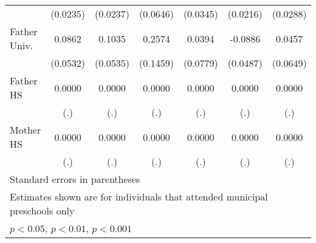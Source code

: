 \begin{table}[htbp]
\begin{tabular}{l*{6}{c}}
            &    (0.0235)         &    (0.0237)         &    (0.0646)         &    (0.0345)         &    (0.0216)         &    (0.0288)         \\
\addlinespace
Father Univ.&      0.0862         &      0.1035         &      0.2574         &      0.0394         &     -0.0886         &      0.0457         \\
            &    (0.0532)         &    (0.0535)         &    (0.1459)         &    (0.0779)         &    (0.0487)         &    (0.0649)         \\
\addlinespace
Father HS   &      0.0000         &      0.0000         &      0.0000         &      0.0000         &      0.0000         &      0.0000         \\
            &         (.)         &         (.)         &         (.)         &         (.)         &         (.)         &         (.)         \\
\addlinespace
Mother HS   &      0.0000         &      0.0000         &      0.0000         &      0.0000         &      0.0000         &      0.0000         \\
            &         (.)         &         (.)         &         (.)         &         (.)         &         (.)         &         (.)         \\
\bottomrule
\multicolumn{7}{l}{\footnotesize Standard errors in parentheses}\\
\multicolumn{7}{l}{\footnotesize Estimates shown are for individuals that attended municipal preschools only}\\
\multicolumn{7}{l}{\footnotesize \sym{*} \(p<0.05\), \sym{**} \(p<0.01\), \sym{***} \(p<0.001\)}\\
\end{tabular}
\end{table}
